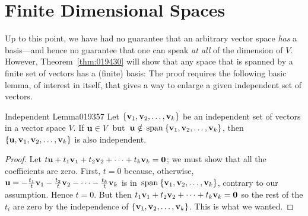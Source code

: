 \section{Finite Dimensional Spaces}
\label{sec:6_4}

Up to this point, we have had no guarantee that an arbitrary vector space \textit{has} a basis---and hence no guarantee that one can speak \textit{at all} of the dimension of $V$. However, Theorem~\ref{thm:019430}
 will show that any space that is spanned by a finite set of vectors has
 a (finite) basis: The proof requires the following basic lemma, of 
interest in itself, that gives a way to enlarge a given independent set 
of vectors.


\begin{lemma}{Independent Lemma}{019357}
Let $\{\textbf{v}_{1}, \textbf{v}_{2}, \dots, \textbf{v}_{k}\}$ be an independent set of vectors in a vector space $V$. If $\textbf{u} \in V$ but\footnotemark \ $\textbf{u} \notin \thinspace\operatorname{span\medspace}\{\textbf{v}_{1}, \textbf{v}_{2}, \dots, \textbf{v}_{k}\}$, then $\{\textbf{u}, \textbf{v}_{1}, \textbf{v}_{2}, \dots, \textbf{v}_{k}\}$ is also independent.
\end{lemma}

\begin{proof}
Let $t\textbf{u} + t_{1}\textbf{v}_{1} + t_{2}\textbf{v}_{2} + \dots + t_{k}\textbf{v}_{k} = \textbf{0}$; we must show that all the coefficients are zero. First, $t = 0$ because, otherwise, $\textbf{u} = - \tfrac{t_1}{t}\textbf{v}_1 - \tfrac{t_2}{t}\textbf{v}_2 - \dots - \tfrac{t_k}{t}\textbf{v}_k$ is in $\thinspace\operatorname{span\medspace}\{\textbf{v}_{1}, \textbf{v}_{2}, \dots, \textbf{v}_{k}\}$, contrary to our assumption. Hence $t = 0$. But then $t_{1}\textbf{v}_{1} + t_{2}\textbf{v}_{2} + \dots + t_{k}\textbf{v}_{k} = \textbf{0}$ so the rest of the $t_{i}$ are zero by the independence of $\{\textbf{v}_{1}, \textbf{v}_{2}, \dots, \textbf{v}_{k}\}$. This is what we wanted.
\end{proof}

\begin{wrapfigure}[8]{l}{8cm}
  \vspace*{-2em}
	\centering
	
\end{wrapfigure}

